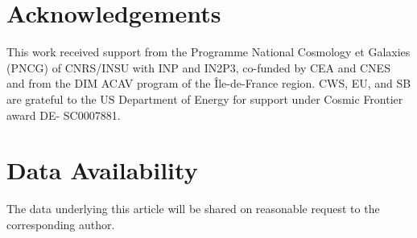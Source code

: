 \documentclass[fleqn,usenatbib]{rasti}
\begin{document}












\section*{Acknowledgements}
This work received support from the Programme National Cosmology et
Galaxies (PNCG) of CNRS/INSU with INP and IN2P3, co-funded by CEA
and CNES and from the DIM ACAV program of the Île-de-France region.
CWS, EU, and SB are grateful to the US Department of Energy for support under Cosmic Frontier award DE- SC0007881. 

  



\section*{Data Availability}

The data underlying this article will be shared on reasonable request to the corresponding author.
  




\newpage
\appendix

\end{document}
